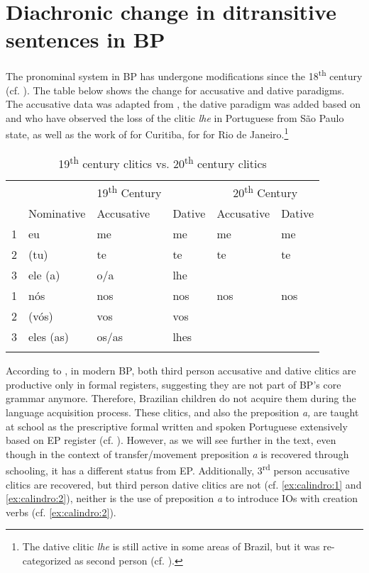 \documentclass[output=paper,colorlinks,citecolor=brown,nonflat]{./langscibook}
\begin{document}
\section{Diachronic change in ditransitive sentences in BP}\label{sec:calindro:2}

The pronominal system in BP has undergone modifications since the 18\textsuperscript{th} century (cf. \citealt{KatoCyrinoCorrêa2009}). The table below shows the change for accusative and dative paradigms. The accusative data was adapted from \citet[246]{KatoCyrinoCorrêa2009}, the dative paradigm was added based on \citet{Calindro2015} and \citet{TorresMoraisBerlinck2006} who have observed the loss of the clitic \textit{lhe} in Portuguese from São Paulo state, as well as the work of \citet{Berlinck1997} for Curitiba, \citet{Silveira1999} for \citet{Freire2005} for Rio de Janeiro.\footnote{The dative clitic \textit{lhe} is still active in some areas of Brazil, but it was re-categorized as second person (cf. \citealt{FigueiredoSilva2007}).}

\begin{table}
\caption{19\textsuperscript{th} century clitics vs. 20\textsuperscript{th} century clitics}
\label{tab:calindro:1}
\begin{tabularx}{\textwidth}{X llX ll}
\lsptoprule
&  &{ 19\textsuperscript{th} Century} & & \multicolumn{2}{c}{{ 20\textsuperscript{th} Century}}\\
\cmidrule(lr{.1em}){2-4}\cmidrule(lr{.1em}){5-6}
& {{Nominative}} & {{Accusative}} & {{Dative}} & {{Accusative}} & {{Dative}}\\
\midrule
{1}  & eu & me & me & me & me\\
{2}  & (tu) & te & te & te & te\\
{3}  & ele (a) & o/a & lhe & {\longrule} & {\longrule}\\
  \tablevspace
{1}  & nós & nos & nos & nos & nos\\
{2} & (vós) & vos & vos & {\longrule} & {\longrule}\\
{3}  & eles (as) & os/as & lhes & {\longrule} & {\longrule}\\
\lspbottomrule
\end{tabularx}
\end{table}

According to \citet{Kato2005}, in modern BP, both third person accusative and dative clitics are productive only in formal registers, suggesting they are not part of BP’s core grammar anymore. Therefore, Brazilian children do not acquire them during the language acquisition process. These clitics, and also the preposition \textit{a,} are taught at school as the prescriptive formal written and spoken Portuguese extensively based on EP register (cf. \citealt{KatoCyrinoCorrêa2009}). However, as we will see further in the text, even though in the context of transfer/movement preposition \textit{a} is recovered through schooling, it has a different status from EP. Additionally, 3\textsuperscript{rd} person accusative clitics are recovered, but third person dative clitics are not (cf. \ref{ex:calindro:1} and \ref{ex:calindro:2}), neither is the use of preposition \textit{a} to introduce IOs with creation verbs (cf. \ref{ex:calindro:2}).
\end{document}
